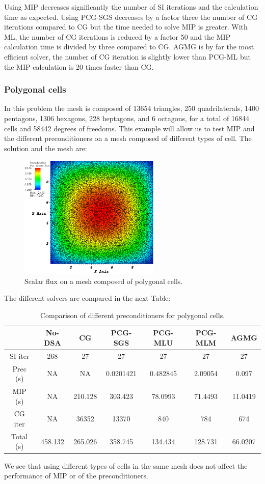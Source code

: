 Using MIP decreases significantly the number of SI iterations and the
calculation time as expected. Using PCG-SGS decreases by a factor three the 
number of CG iterations compared to CG but the time needed to solve MIP is
greater. With ML, the number of CG iterations is reduced by a factor 50 and 
the MIP calculation time is divided by three compared to CG. AGMG is by far 
the most efficient solver, the number of CG iteration is slightly lower 
than PCG-ML but the MIP calculation is 20 times faster than CG.

\subsubsection{Polygonal cells}
In this problem the mesh is composed of 13654 triangles, 250 quadrilaterals,
1400 pentagons, 1306 hexagons, 228 heptagons, and 6 octagons, for a total of
16844 cells and 58442 degrees of freedoms. This example will allow us to test
MIP and the different preconditioners on a mesh composed of different types of
cell. The solution and the mesh are:
\begin{figure}[H]
\centering
\includegraphics[width=0.6\textwidth]{./Dsa/homog_poly_crop}
\caption{Scalar flux on a mesh composed of polygonal cells.}
\end{figure}
The different solvers are compared in the next Table:
\begin{table}[H]
\begin{center}
\caption{Comparison of different preconditioners for polygonal cells.}
\begin{tabular}{|c|c|c|c|c|c|c|}
\hline
 & No-DSA & CG & PCG-SGS & PCG-MLU & PCG-MLM & AGMG\\
\hline
SI iter & 268 & 27 & 27 & 27 & 27 & 27\\
Prec (s) & NA & NA & 0.0201421 & 0.482845 & 2.09054 & 0.097\\
MIP (s) & NA & 210.128 & 303.423 & 78.0993 & 71.4493 & 11.0419\\
CG iter & NA & 36352 & 13370 & 840 & 784 & 674\\
Total (s) & 458.132 & 265.026 & 358.745 & 134.434 & 128.731 & 66.0207\\
\hline
\end{tabular}
\end{center}
\end{table}
We see that using different types of cells in the same mesh does not affect
the performance of MIP or of the preconditioners. 


